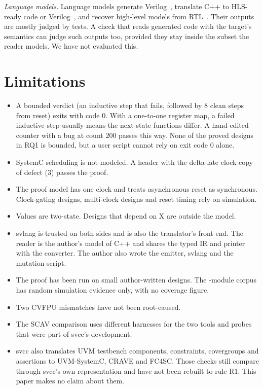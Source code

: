\documentclass[conference]{IEEEtran}
\newcommand{\code}[1]{{\fontshape{n}\ttfamily #1}}
\begin{document}
\emph{Language models.} Language models generate Verilog~\cite{liu2023verilogeval,thakur2024verigen},
translate C++ to HLS-ready code or Verilog~\cite{collini2024c2hlsc,lyu2026autoc2v}, and recover
high-level models from RTL~\cite{tang2026rtlrex}. Their outputs are mostly judged by tests. A check
that reads generated code with the target's semantics can judge such outputs too, provided they
stay inside the subset the reader models. We have not evaluated this.

\section{Limitations}
\label{sec:limits}

\begin{itemize}
\item A bounded verdict (an inductive step that fails, followed by 8 clean steps from reset) exits
with code 0. With a one-to-one register map, a failed inductive step usually means the next-state
functions differ. A hand-edited counter with a bug at count 200 passes this way. None of the
\nProved{} proved designs in RQ1 is bounded, but a user script cannot rely on exit code 0 alone.
\item SystemC scheduling is not modeled. A header with the delta-late clock copy of defect (3)
passes the proof.
\item The proof model has one clock and treats asynchronous reset as synchronous. Clock-gating
designs, multi-clock designs and reset timing rely on simulation.
\item Values are two-state. Designs that depend on X are outside the model.
\item \code{svlang} is trusted on both sides and is also the translator's front end. The reader is
the author's model of C++ and shares the typed IR and printer with the converter. The author also
wrote the emitter, \code{svlang} and the mutation script.
\item The proof has been run on \nDesigns{} small author-written designs. The \nModules{}-module
corpus has random simulation evidence only, with no coverage figure.
\item Two CVFPU mismatches have not been root-caused.
\item The SCAV comparison uses different harnesses for the two tools and probes that were part of
\code{svcc}'s development.
\item \code{svcc} also translates UVM testbench components, constraints, covergroups and
assertions to UVM-SystemC, CRAVE and FC4SC. Those checks still compare through \code{svcc}'s own
representation and have not been rebuilt to rule R1. This paper makes no claim about them.
\end{itemize}
\end{document}

